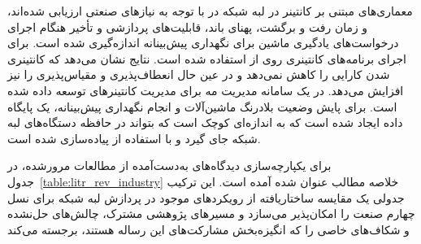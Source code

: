 معماری‌های مبتنی بر کانتینر در لبه شبکه در \cite{liu2021performance} با توجه به نیازهای صنعتی ارزیابی شده‌اند، و زمان رفت و برگشت، پهنای باند، قابلیت‌های پردازشی و تأخیر هنگام اجرای درخواست‌های یادگیری ماشین برای نگهداری پیش‌بینانه اندازه‌گیری شده است. برای اجرای برنامه‌های کانتینری روی  از  استفاده شده است. نتایج نشان می‌دهد که کانتینری شدن کارایی را کاهش نمی‌دهد و در عین حال انعطاف‌پذیری و مقیاس‌پذیری را نیز افزایش می‌دهد. در \cite{oyekanlu2017predictive} یک سامانه مدیریت مه برای مدیریت کانتینرهای  توسعه داده شده است. برای پایش وضعیت بلادرنگ ماشین‌آلات و انجام نگهداری پیش‌بینانه، یک پایگاه داده ایجاد شده است که به اندازه‌ای کوچک است که بتواند در حافظه دستگاه‌های لبه شبکه جای گیرد و با استفاده از  پیاده‌سازی شده است.

برای یکپارچه‌سازی دیدگاه‌های به‌دست‌آمده از مطالعات مرورشده، در جدول~\ref{table:litr_rev_industry} خلاصه مطالب عنوان شده آمده است. این ترکیب جدولی یک مقایسه ساختاریافته از رویکردهای موجود در پردازش لبه‌ شبکه برای نسل چهارم صنعت را امکان‌پذیر می‌سازد و مسیرهای پژوهشی مشترک، چالش‌های حل‌نشده و شکاف‌های خاصی را که انگیزه‌بخش مشارکت‌های این رساله هستند، برجسته می‌کند

